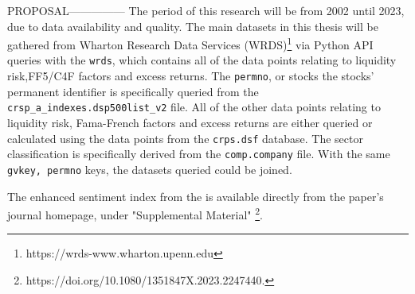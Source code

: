 PROPOSAL---------------
The period of this research will be from 2002 until 2023, due to data availability and quality. The main datasets in this thesis will be gathered from Wharton Research Data Services (WRDS)\footnote{https://wrds-www.wharton.upenn.edu} via Python API queries with the \texttt{wrds}, which contains all of the data points relating to liquidity risk,FF5/C4F factors and excess returns. The \texttt{permno}, or stocks the stocks' permanent identifier is specifically queried from the \texttt{crsp\_a\_indexes.dsp500list\_v2}
file. All of the other data points relating to liquidity risk, Fama-French factors and excess returns are either queried or calculated using the data points from the \texttt{crps.dsf} database. The sector classification is specifically derived from the \texttt{comp.company} file. With the same \texttt{gvkey, permno} keys, the datasets queried could be joined.

The enhanced sentiment index from the  is available directly from the paper's journal homepage, under "Supplemental Material" \footnote{https://doi.org/10.1080/1351847X.2023.2247440.}.